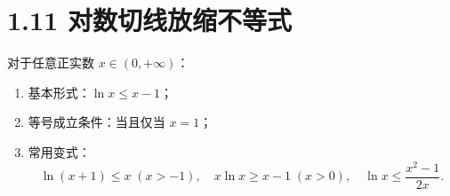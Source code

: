 \documentclass{article}
\begin{document}
\section*{1.11 对数切线放缩不等式}
对于任意正实数 \( x \in (0,+\infty) \)：
\begin{enumerate}
    \item 基本形式：\( \ln x \leq x-1 \)；
    \item 等号成立条件：当且仅当 \( x=1 \)；
    \item 常用变式：
    \[
    \ln(x+1) \leq x\;(x>-1),\quad x\ln x \geq x-1\;(x>0),\quad \ln x \leq \frac{x^2-1}{2x}.
    \]
\end{enumerate}
\end{document}
